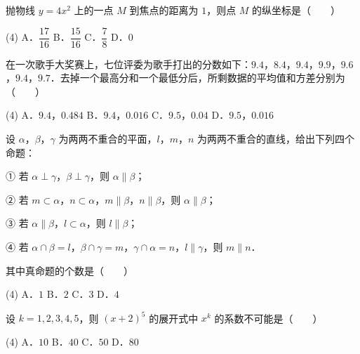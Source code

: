 \begin{question}
抛物线 $y = 4x^2$ 上的一点 $M$ 到焦点的距离为 $1$，则点 $M$ 的纵坐标是\mbox{（　　）}

\begin{gkopts}(4)
\task A．$\dfrac{17}{16}$
\task B．$\dfrac{15}{16}$
\task C．$\dfrac{7}{8}$
\task D．$0$
\end{gkopts}

\end{question}
\begin{question}
在一次歌手大奖赛上，七位评委为歌手打出的分数如下：$9.4$，$8.4$，$9.4$，$9.9$，$9.6$，$9.4$，$9.7$．去掉一个最高分和一个最低分后，所剩数据的平均值和方差分别为\mbox{（　　）}

\begin{gkopts}(4)
\task A．$9.4$，$0.484$
\task B．$9.4$，$0.016$
\task C．$9.5$，$0.04$
\task D．$9.5$，$0.016$
\end{gkopts}

\end{question}
\begin{question}
设 $\alpha$，$\beta$，$\gamma$ 为两两不重合的平面，$l$，$m$，$n$ 为两两不重合的直线，给出下列四个命题：

① 若 $\alpha \perp \gamma$，$\beta \perp \gamma$，则 $\alpha \parallel \beta$；

② 若 $m \subset \alpha$，$n \subset \alpha$，$m \parallel \beta$，$n \parallel \beta$，则 $\alpha \parallel \beta$；

③ 若 $\alpha \parallel \beta$，$l \subset \alpha$，则 $l \parallel \beta$；

④ 若 $\alpha \cap \beta = l$，$\beta \cap \gamma = m$，$\gamma \cap \alpha = n$，$l \parallel \gamma$，则 $m \parallel n$．

其中真命题的个数是\mbox{（　　）}

\begin{gkopts}(4)
\task A．$1$
\task B．$2$
\task C．$3$
\task D．$4$
\end{gkopts}

\end{question}
\begin{question}
设 $k = 1, 2, 3, 4, 5$，则 $(x + 2)^5$ 的展开式中 $x^k$ 的系数不可能是\mbox{（　　）}

\begin{gkopts}(4)
\task A．$10$
\task B．$40$
\task C．$50$
\task D．$80$
\end{gkopts}

\end{question}
